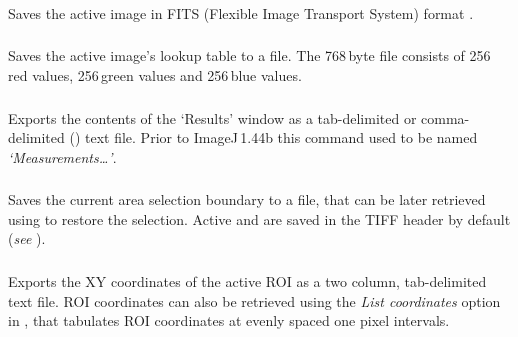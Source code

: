 \subsubsection{\protect{}\label{sub:FITS...}}

Saves the active image in FITS (Flexible Image Transport
System) format \cite{C-FITSwriter}.


\subsubsection{\protect{}\label{sub:LUT...}}

Saves the active image's lookup table to a file. The 768\,byte
file consists of 256\,red values, 256\,green values and 256\,blue
values.


\subsubsection{\protect{}\label{sub:Measurements...}}

Exports the contents of the `Results' window as a tab-delimited
or comma-delimited () text file. Prior
to ImageJ\,1.44b this command used to be named \emph{`Measurements\ldots{}'}.


\subsubsection{\protect{}\label{sub:Selection...}}

Saves the current area selection boundary to a file, that can be later
retrieved using 
to restore the selection. Active  and
 are saved in the TIFF header by default
(\emph{see} ).


\subsubsection[\protect\userinterface{XY Coordinates\ldots{}}]{\protect{}\label{sub:SaveAs>XYcoordinates...}\improvement{}}

Exports the XY coordinates of the active ROI as a two column, tab-delimited
text file. ROI coordinates can also be retrieved
using the \emph{List coordinates} option in ,
that tabulates ROI coordinates at evenly spaced one pixel intervals.



